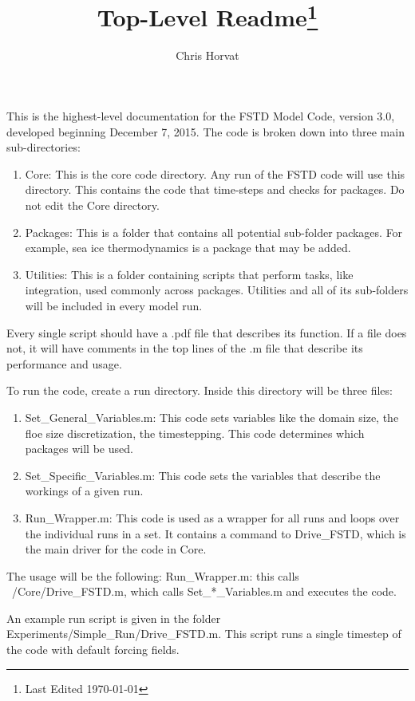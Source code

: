 \documentclass{article}
\title{Top-Level Readme\footnote{Last Edited \today}}
\author{Chris Horvat}
\date{}
\begin{document}
\maketitle
\noindent This is the highest-level documentation for the FSTD Model Code, version 3.0, developed beginning December 7, 2015. The code is broken down into three main sub-directories:
\begin{enumerate}
\item Core: This is the core code directory. Any run of the FSTD code will use this directory. This contains the code that time-steps and checks for packages. Do not edit the Core directory. 
\item Packages: This is a folder that contains all potential sub-folder packages. For example, sea ice thermodynamics is a package that may be added.
\item Utilities: This is a folder containing scripts that perform tasks, like integration, used commonly across packages. Utilities and all of its sub-folders will be included in every model run. 
\end{enumerate}

Every single script should have a .pdf file that describes its function. If a file does not, it will have comments in the top lines of the .m file that describe its performance and usage. 

To run the code, create a run directory. Inside this directory will be three files: 
\begin{enumerate}
\item Set\_General\_Variables.m: This code sets variables like the domain size, the floe size discretization, the timestepping. This code determines which packages will be used.
\item Set\_Specific\_Variables.m: This code sets the variables that describe the workings of a given run. 
\item Run\_Wrapper.m: This code is used as a wrapper for all runs and loops over the individual runs in a set. It contains a command to Drive\_FSTD, which is the main driver for the code in Core. 
\end{enumerate}

The usage will be the following: Run\_Wrapper.m: this calls ~/Core/Drive\_FSTD.m, which calls Set\_*\_Variables.m and executes the code. 


An example run script is given in the folder Experiments/Simple\_Run/Drive\_FSTD.m. This script runs a single timestep of the code with default forcing fields. 
\end{document}
